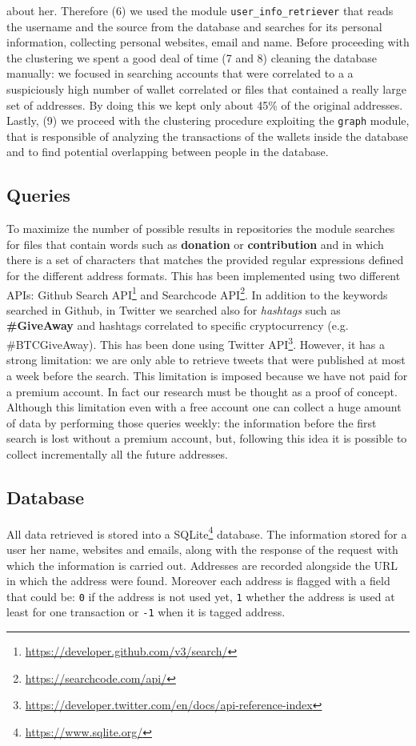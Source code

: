 about her. Therefore (6) we used the module \verb|user_info_retriever| that
reads the username and the source from the database and searches for its
personal information, collecting personal websites, email and name.
Before proceeding with the clustering we spent a good deal of time (7 and 8)
cleaning the database manually: we focused in searching accounts that were
correlated to a a suspiciously high number of wallet correlated or files that
contained a really large set of addresses. By doing this we kept only about 45\%
of the original addresses.
Lastly, (9) we proceed with the clustering procedure exploiting the \verb|graph|
module, that is responsible of analyzing the transactions of the wallets 
inside the database and to find potential overlapping between people in the
database.

\subsection{Queries}
\label{sec:queries}
To maximize the number of possible results in repositories the module
\walletcollector{} searches for files that contain words such as
\textbf{donation} or \textbf{contribution} and in which there is a set of
characters that matches the provided regular expressions defined for the
different address formats. This has been implemented using two different APIs:
Github Search API\footnote{\url{https://developer.github.com/v3/search/}} and
Searchcode API\footnote{\url{https://searchcode.com/api/}}.
In addition to the keywords searched in Github, in Twitter we searched also for
\textit{hashtags} such as \textbf{\#GiveAway} and
hashtags correlated to specific cryptocurrency (e.g. \#BTCGiveAway). This has
been done using Twitter
API\footnote{\url{https://developer.twitter.com/en/docs/api-reference-index}}.
However, it has a strong limitation: we are only able to retrieve tweets that
were published at most a week before the search. This limitation is imposed
because we have not paid for a premium account. In fact our research must be
thought as a proof of concept.
Although this limitation even with a free account one can collect a huge amount
of data by performing those queries weekly:
the information before the first search is lost without a premium account, but,
following this idea it is possible to collect incrementally all the future
addresses.

\subsection{Database}
All data retrieved is stored into a
SQLite\footnote{\url{https://www.sqlite.org/}} database. The information stored
for a user her name, websites and emails, along with the response of the request
with which the information is carried out. Addresses are recorded alongside the
URL in which the address were found. Moreover each address is flagged with a
field that could be: \texttt{0} if the address is not used yet, \texttt{1}
whether the address is used at least for one transaction or \texttt{-1} when it
is tagged address.